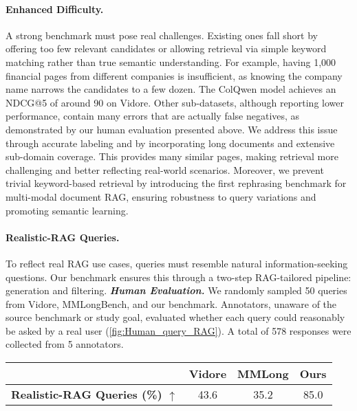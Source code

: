 \paragraph{Enhanced Difficulty.}
A strong benchmark must pose real challenges. Existing ones fall short by offering too few relevant candidates or allowing retrieval via simple keyword matching rather than true semantic understanding.  
For example, having 1,000 financial pages from different companies is insufficient, as knowing the company name narrows the candidates to a few dozen. The ColQwen model achieves an NDCG@5 of around 90 on Vidore. Other sub-datasets, although reporting lower performance, contain many errors that are actually false negatives, as demonstrated by our human evaluation presented above.  
We address this issue through accurate labeling and by incorporating long documents and extensive sub-domain coverage. This provides many similar pages, making retrieval more challenging and better reflecting real-world scenarios. Moreover, we prevent trivial keyword-based retrieval by introducing the first rephrasing benchmark for multi-modal document RAG, ensuring robustness to query variations and promoting semantic learning.




\paragraph{Realistic-RAG Queries.}
To reflect real RAG use cases, queries must resemble natural information-seeking questions. Our benchmark ensures this through a two-step RAG-tailored pipeline: generation and filtering. 
\textbf{\emph{Human Evaluation.}} We randomly sampled 50 queries from Vidore, MMLongBench, and our benchmark.
Annotators, unaware of the source benchmark or study goal, evaluated whether each query could reasonably be asked by a real user (\cref{fig:Human_query_RAG}). A total of 578 responses were collected from 5 annotators. 


{\footnotesize
\vspace{0.15cm}
\hspace{0.02cm}
\centering
\begin{tabular}{@{\extracolsep{\fill}}lccc} 
\toprule & \textbf{Vidore} & \textbf{MMLong}  & \textbf{Ours}  \\
\midrule
\textbf{Realistic-RAG Queries (\%) \(\uparrow\) } & 43.6  & 35.2  & 85.0 \\
\bottomrule
\end{tabular}}


